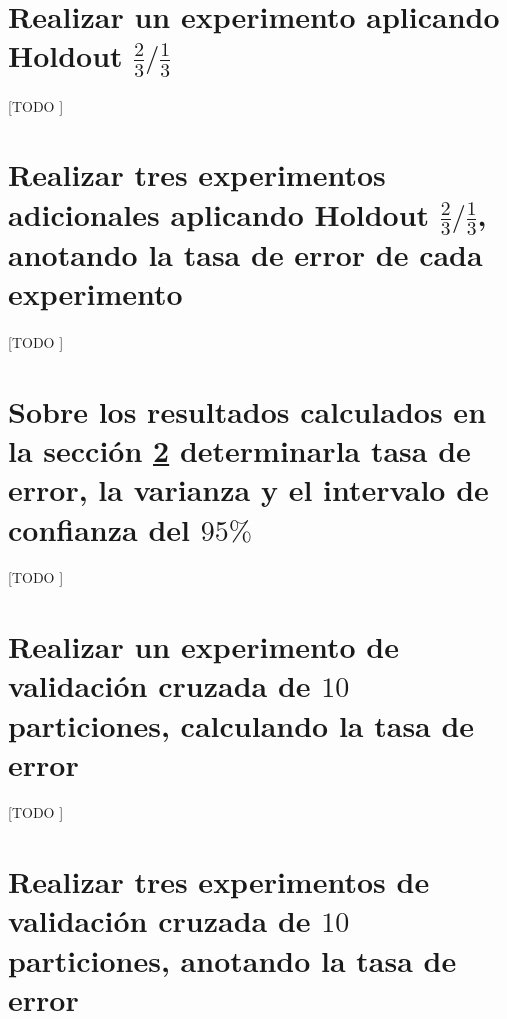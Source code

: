 \documentclass{article}
\begin{document}
	\section{Realizar un experimento aplicando Holdout $\frac{2}{3}/\frac{1}{3}$}
	\label{sec:e1}

		\paragraph{}
		[TODO ]


	\section{Realizar tres experimentos adicionales aplicando Holdout $\frac{2}{3}/\frac{1}{3}$, anotando la tasa de error de cada experimento}
	\label{sec:e2}

		\paragraph{}
		[TODO ]



	\section{Sobre los resultados calculados en la sección \ref{sec:e2} determinarla tasa de error, la varianza y el intervalo de confianza del $95\%$}
	\label{sec:e3}

		\paragraph{}
		[TODO ]

	\section{Realizar un experimento de validación cruzada de $10$ particiones, calculando la tasa de error}
	\label{sec:e4}

		\paragraph{}
		[TODO ]


	\section{Realizar tres experimentos de validación cruzada de $10$ particiones, anotando la tasa de error}
	\label{sec:e5}
\end{document}
